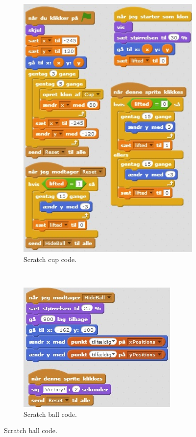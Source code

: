 \begin{figure}[h]
  \centering
    \begin{subfigure}[b]{0.45\textwidth}
    \begin{center}
      \includegraphics[scale=0.7]{./pics/scratch_ball_code1}
      \caption{Scratch cup code.}
      \label{fig:scratch_ball_code1}
    \end{center}
    \end{subfigure}
    ~
    \begin{subfigure}[b]{0.45\textwidth}
    \begin{center}
      \includegraphics[scale=0.7]{./pics/scratch_ball_code2}
      \caption{Scratch ball code.}
      \label{fig:scratch_ball_code2}
    \end{center}
    \end{subfigure}
    

\end{figure}
